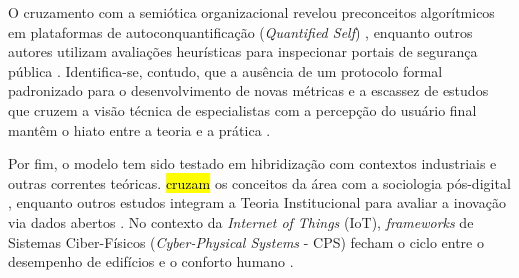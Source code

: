 \documentclass[
	12pt,				%
	oneside,			%
	a4paper,			%
	english,			%
	brazil				%
	]{abntex2ppgsi}
\newcommand{\hlciteonline}[1]{\colorbox{yellow}{\citeonline{#1}}} %
\begin{document}
    O cruzamento com a semiótica organizacional revelou preconceitos algorítmicos em plataformas de autoconquantificação (\textit{Quantified Self}) \cite{Hornung2015}, enquanto outros autores utilizam avaliações heurísticas para inspecionar portais de segurança pública \cite{Victorelli2024Adopting, durango2024data, capeleti2023heuristic}. Identifica-se, contudo, que a ausência de um protocolo formal padronizado para o desenvolvimento de novas métricas e a escassez de estudos que cruzem a visão técnica de especialistas com a percepção do usuário final mantêm o hiato entre a teoria e a prática \cite{Capeleti2024Human}.

    Por fim, o modelo tem sido testado em hibridização com contextos industriais e outras correntes teóricas. \hlciteonline{Jandric2023} \hl{cruzam} os conceitos da área com a sociologia pós-digital \cite{Zou2020769}, enquanto outros estudos integram a Teoria Institucional para avaliar a inovação via dados abertos \cite{mu2024institutional}. No contexto da \textit{Internet of Things} (IoT), \textit{frameworks} de Sistemas Ciber-Físicos (\textit{Cyber-Physical Systems} - CPS) fecham o ciclo entre o desempenho de edifícios e o conforto humano \cite{bavaresco2019technological}. 
\end{document}

